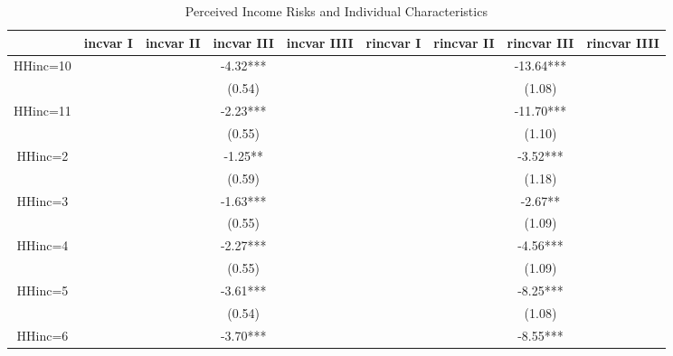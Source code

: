 
\begin{table}[ht]
\centering
\begin{adjustbox}{width={0.9\textwidth},totalheight={\textheight}}
\begin{threeparttable}
\caption{Perceived Income Risks and Individual Characteristics}
\label{micro_reg}\begin{tabular}{ccccccccc}
\toprule
{} & incvar I & incvar II & incvar III & incvar IIII & rincvar I & rincvar II & rincvar III & rincvar IIII \\
\midrule
HHinc=10     &          &           &   -4.32*** &             &           &            &   -13.64*** &              \\
             &          &           &     (0.54) &             &           &            &      (1.08) &              \\
HHinc=11     &          &           &   -2.23*** &             &           &            &   -11.70*** &              \\
             &          &           &     (0.55) &             &           &            &      (1.10) &              \\
HHinc=2      &          &           &    -1.25** &             &           &            &    -3.52*** &              \\
             &          &           &     (0.59) &             &           &            &      (1.18) &              \\
HHinc=3      &          &           &   -1.63*** &             &           &            &     -2.67** &              \\
             &          &           &     (0.55) &             &           &            &      (1.09) &              \\
HHinc=4      &          &           &   -2.27*** &             &           &            &    -4.56*** &              \\
             &          &           &     (0.55) &             &           &            &      (1.09) &              \\
HHinc=5      &          &           &   -3.61*** &             &           &            &    -8.25*** &              \\
             &          &           &     (0.54) &             &           &            &      (1.08) &              \\
HHinc=6      &          &           &   -3.70*** &             &           &            &    -8.55*** &              \\

\end{tabular}
\end{threeparttable}
\end{adjustbox}
\end{table}
